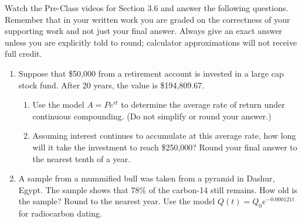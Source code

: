 


\noindent Watch the Pre-Class videos for Section 3.6 and answer the following questions. Remember that in your written work you are graded on the correctness of your supporting work and not just your final answer. Always give an exact answer unless you are explicitly told to round; calculator approximations will not receive full credit. 


\begin{enumerate}
\item Suppose that \$50,000 from a retirement account is invested in a large cap stock fund.  After 20 years, the value is \$194,809.67.
\begin{enumerate}
\item Use the model $A=Pe^{rt}$ to determine the average rate of return under continuous compounding. (Do not simplify or round your answer.)
\vfill
\item  Assuming interest continues to accumulate at this average rate, how long will it take the investment to reach \$250,000?  Round your final answer to the nearest tenth of a year.
\vfill


\end{enumerate}

\newpage

\item  A sample from a mummified bull was taken from a pyramid in Dashur, Egypt.  The sample shows that 78\% of the carbon-14 still remains.  How old is the sample?  Round to the nearest year.  Use the model $Q(t)=Q_0e^{-0.000121t}$ for radiocarbon dating.



\end{enumerate}



